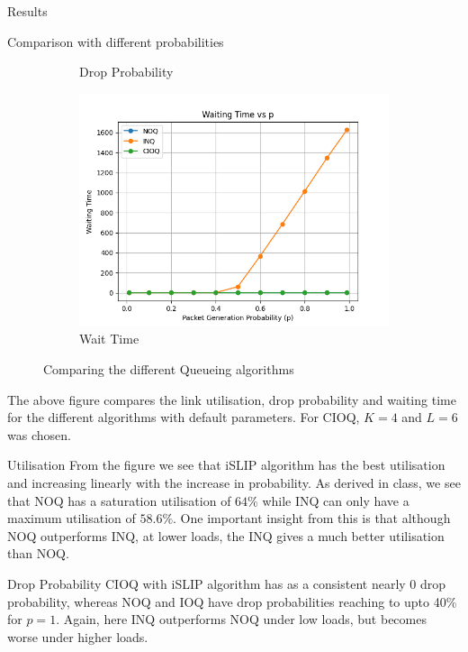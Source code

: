 \begin{section}{Results}
\begin{subsection}{Comparison with different probabilities}
\begin{figure}[h!]
\begin{subfigure}[b]{0.45\textwidth}
            \caption{Drop Probability}
            \label{fig:drop_prob}
        \end{subfigure}
        \hfill
        \begin{subfigure}[b]{0.45\textwidth}
            \centering
            \includegraphics[width=\textwidth]{figures/fig1/fig1c.png}
            \caption{Wait Time}
            \label{fig:wait_time}
        \end{subfigure}
        
        \caption{Comparing the different Queueing algorithms}
        \label{fig:combined}
    \end{figure}

    The above figure compares the link utilisation, drop probability and waiting time for the different algorithms with default parameters. For CIOQ, $K=4$ and $L=6$ was chosen. 
    \begin{subsubsection}{Utilisation}
        From the figure we see that iSLIP algorithm has the best utilisation and increasing linearly with the increase in probability. As derived in class, we see that NOQ has a saturation utilisation of $64\%$ while INQ can only have a maximum utilisation of $58.6\%$.
        One important insight from this is that although NOQ outperforms INQ, at lower loads, the INQ gives a much better utilisation than NOQ. 
    \end{subsubsection}

    \begin{subsubsection}{Drop Probability}
        CIOQ with iSLIP algorithm has as a consistent nearly 0 drop probability, whereas NOQ and IOQ have drop probabilities reaching to upto 40\% for $p=1$. Again, here INQ outperforms NOQ under low loads, but becomes worse under higher loads.
    \end{subsubsection}


\end{subsection}
\end{section}

